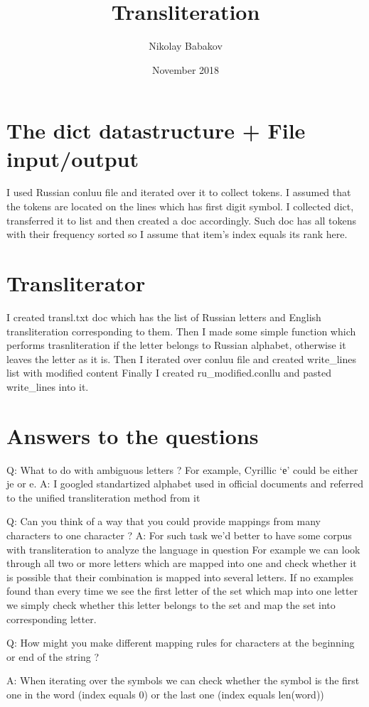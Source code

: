 \documentclass{article}
\title{Transliteration}
\author{Nikolay Babakov }
\date{November 2018}
\begin{document}
\maketitle

\section{The dict datastructure + File input/output}
I used Russian conluu file and iterated over it to collect tokens. I assumed that the tokens are located on the lines which has first digit symbol.
I collected dict, transferred it to list and then created a doc accordingly.
Such doc has all tokens with their frequency sorted so I assume that item's index equals its rank here.

\section{Transliterator}
I created transl.txt doc which has the list of Russian letters and English transliteration corresponding to them.
Then I made some simple function which performs trasnliteration if the letter belongs to Russian alphabet, otherwise it leaves the letter as it is. 
Then I iterated over conluu file and created write_lines list with modified content
Finally I created ru_modified.conllu and pasted write_lines into it.

\section{Answers to the questions}
Q: What to do with ambiguous letters ? For example, Cyrillic `е' could be either je or e.
A: I googled standartized alphabet used in official documents and referred to the unified transliteration method from it

Q: Can you think of a way that you could provide mappings from many characters to one character ?
A: For such task we'd better to have some corpus with transliteration to analyze the language in question
For example we can look through all two or more letters which are mapped into one and check whether it is possible that their combination is mapped into several letters. If no examples found than every time we see the first letter of the set which map into one letter we simply check whether this letter belongs to the set and map the set into corresponding letter.

Q: How might you make different mapping rules for characters at the beginning or end of the string ?

A: When iterating over the symbols we can check whether the symbol is the first one in the word (index equals 0) or the last one (index equals len(word))
\end{document}

